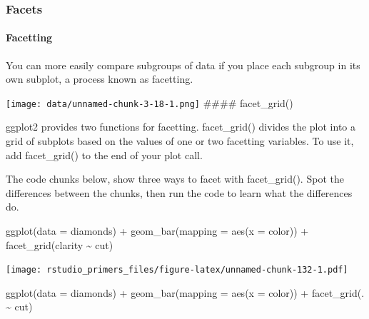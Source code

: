 \documentclass[
]{article}
\newenvironment{Shaded}{\begin{snugshade}}{\end{snugshade}}
\newcommand{\AttributeTok}[1]{\textcolor[rgb]{0.77,0.63,0.00}{#1}}
\newcommand{\FunctionTok}[1]{\textcolor[rgb]{0.00,0.00,0.00}{#1}}
\newcommand{\NormalTok}[1]{#1}
\newcommand{\SpecialCharTok}[1]{\textcolor[rgb]{0.00,0.00,0.00}{#1}}
\begin{document}
\hypertarget{facets}{%
\subsubsection{Facets}\label{facets}}

\hypertarget{facetting}{%
\paragraph{Facetting}\label{facetting}}

You can more easily compare subgroups of data if you place each subgroup
in its own subplot, a process known as facetting.

\texttt{[image: data/unnamed-chunk-3-18-1.png]} \#\#\#\# facet\_grid()

ggplot2 provides two functions for facetting. facet\_grid() divides the
plot into a grid of subplots based on the values of one or two facetting
variables. To use it, add facet\_grid() to the end of your plot call.

The code chunks below, show three ways to facet with facet\_grid(). Spot
the differences between the chunks, then run the code to learn what the
differences do.

\begin{Shaded}
\begin{Highlighting}[]
\FunctionTok{ggplot}\NormalTok{(}\AttributeTok{data =}\NormalTok{ diamonds) }\SpecialCharTok{+}
  \FunctionTok{geom\_bar}\NormalTok{(}\AttributeTok{mapping =} \FunctionTok{aes}\NormalTok{(}\AttributeTok{x =}\NormalTok{ color)) }\SpecialCharTok{+}
  \FunctionTok{facet\_grid}\NormalTok{(clarity }\SpecialCharTok{\textasciitilde{}}\NormalTok{ cut)}
\end{Highlighting}
\end{Shaded}

\texttt{[image: rstudio\_primers\_files/figure-latex/unnamed-chunk-132-1.pdf]}

\begin{Shaded}
\begin{Highlighting}[]
\FunctionTok{ggplot}\NormalTok{(}\AttributeTok{data =}\NormalTok{ diamonds) }\SpecialCharTok{+}
  \FunctionTok{geom\_bar}\NormalTok{(}\AttributeTok{mapping =} \FunctionTok{aes}\NormalTok{(}\AttributeTok{x =}\NormalTok{ color)) }\SpecialCharTok{+}
  \FunctionTok{facet\_grid}\NormalTok{(. }\SpecialCharTok{\textasciitilde{}}\NormalTok{ cut)}
\end{Highlighting}
\end{Shaded}
\end{document}
